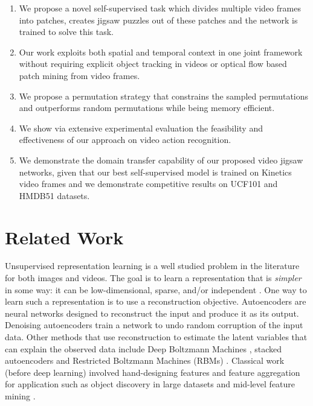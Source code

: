 \documentclass[10pt,twocolumn,letterpaper]{article}
\begin{document}
\begin{enumerate}
 \item We propose a novel self-supervised task which divides multiple video frames into patches, creates jigsaw puzzles out of these patches and the network is trained to solve this task.
 \item Our work exploits both spatial and temporal context in one joint framework without requiring explicit object tracking in videos or optical flow based patch mining from video frames.
 \item We propose a permutation strategy that constrains the sampled permutations and outperforms random permutations while being memory efficient. 
 \item We show via extensive experimental evaluation the feasibility and effectiveness of our approach on video action recognition. 
 \item We demonstrate the domain transfer capability of our proposed video jigsaw networks, given that our best self-supervised model is trained on Kinetics \cite{kay2017kinetics} video frames and we demonstrate competitive results on UCF101 \cite{soomro2012ucf101} and HMDB51\cite{kuehne2011hmdb} datasets.
\end{enumerate}

\section{Related Work}
Unsupervised representation learning is a well studied problem in the literature for both images and videos. The goal is to learn a representation that is \textit{simpler} in some way: it can be low-dimensional, sparse, and/or independent \cite{goodfellow2016deep}. One way to learn such a representation is to use a reconstruction objective. Autoencoders \cite{hinton2006reducing} are neural networks designed to reconstruct the input and produce it as its output. Denoising autoencoders \cite{vincent2008extracting} train a network to undo random corruption of the input data. Other methods that use reconstruction to estimate the latent variables that can explain the observed data include Deep Boltzmann Machines \cite{salakhutdinov2010efficient}, stacked autoencoders \cite{lee2007efficient,bengio2007greedy} and Restricted Boltzmann Machines (RBMs) \cite{hinton1986learning,smolensky1986information}. Classical work (before deep learning) involved hand-designing features and feature aggregation for application such as object discovery in large datasets \cite{sivic2005discovering,russell2006using} and mid-level feature mining \cite{doersch2013mid,singh2012unsupervised,sun2013learning}. 
\end{document}
